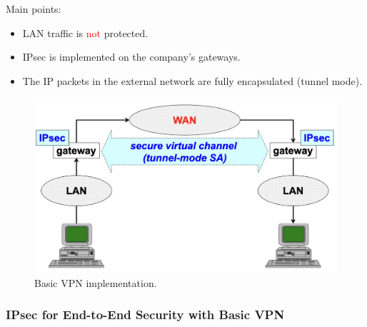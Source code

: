\begin{multicols}{2}
\raggedcolumns
    Main points:
    \begin{itemize}
        \item LAN traffic is \textcolor{red}{not} protected.
        \item IPsec is implemented on the company's gateways.
        \item The IP packets in the external network are fully encapsulated (tunnel mode).
    \end{itemize}
\columnbreak

\begin{figure}[H]
    \centering
  \includegraphics[width=\linewidth]{Images/NetSec/basic_vpn.png}
  \caption{Basic VPN implementation.}
  \label{fig:basicVPN}
\end{figure}
\end{multicols}

\clearpage

\subsubsection{IPsec for End-to-End Security with Basic VPN}

